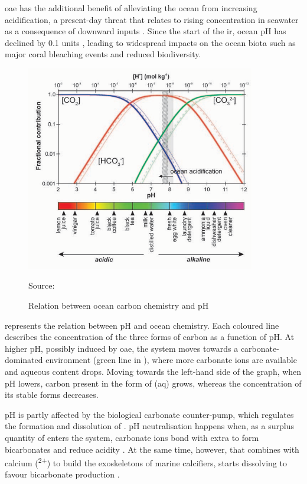 \ac{oae} has the additional benefit of alleviating the ocean from increasing acidification, a present-day threat that relates to rising  concentration in seawater as a consequence of  downward inputs \citep{ma2015primary}. Since the start of the \ac{ir}, ocean pH has declined by 0.1 units \citep{devries2022ocean}, leading to widespread impacts on the ocean biota such as major coral bleaching events and reduced biodiversity.

\begin{figure}[H]
\caption{Relation between ocean carbon chemistry and pH}
\label{pHacid}
\centering
\includegraphics[width=10cm]{fig/1_Introduction/Carbonate_Chemistry.png}

\scriptsize Source: \cite{barker2012ocean}
\end{figure}

 represents the relation between pH and ocean chemistry. Each coloured line describes the concentration of the three forms of carbon as a function of pH. At higher pH, possibly induced by \ac{oae}, the system moves towards a carbonate-dominated environment (green line in ), where more carbonate ions are available and aqueous  content drops. Moving towards the left-hand side of the graph, when pH lowers, carbon present in the form of (aq) grows, whereas the concentration of its stable forms decreases.

pH is partly affected by the biological carbonate counter-pump, which regulates the formation and dissolution of . pH neutralisation happens when, as a surplus quantity of  enters the system, carbonate ions bond with extra  to form bicarbonates and reduce acidity \citep{scott2019role, barker2012ocean}. At the same time, however,  that combines with calcium (\textsuperscript{2+}) to build the exoskeletons of marine calcifiers, starts dissolving to favour bicarbonate production \citep{mcnicholl2020ocean}.

